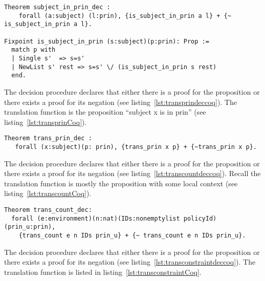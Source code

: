 \begin{lstlisting}
Theorem subject_in_prin_dec :
    forall (a:subject) (l:prin), {is_subject_in_prin a l} + {~ is_subject_in_prin a l}.

Fixpoint is_subject_in_prin (s:subject)(p:prin): Prop :=
  match p with
  | Single s'  => s=s'
  | NewList s' rest => s=s' \/ (is_subject_in_prin s rest)
  end.
\end{lstlisting}

The decision procedure  declares that either there is a proof for the proposition  or there exists a proof for its negation (see listing~\ref{lst:transprindeccoq}). The translation function  is the proposition ``subject x is in prin'' (see listing~\ref{lst:transprinCoq}).

\begin{minipage}[c]{0.95\textwidth}
\begin{lstlisting}
Theorem trans_prin_dec :
   forall (x:subject)(p: prin), {trans_prin x p} + {~trans_prin x p}.
\end{lstlisting}
\end{minipage}

The decision procedure  declares that either there is a proof for the proposition  or there exists a proof for its negation (see listing~\ref{lst:transcountdeccoq}). Recall the translation function  is mostly the proposition  with some local context (see listing~\ref{lst:transcountCoq}).

\begin{lstlisting}
Theorem trans_count_dec: 
  forall (e:environment)(n:nat)(IDs:nonemptylist policyId)(prin_u:prin), 
    {trans_count e n IDs prin_u} + {~ trans_count e n IDs prin_u}.
\end{lstlisting}

The decision procedure  declares that either there is a proof for the proposition  or there exists a proof for its negation (see listing~\ref{lst:transconstraintdeccoq}). The translation function  is listed in listing~\ref{lst:transconstraintCoq}. 


